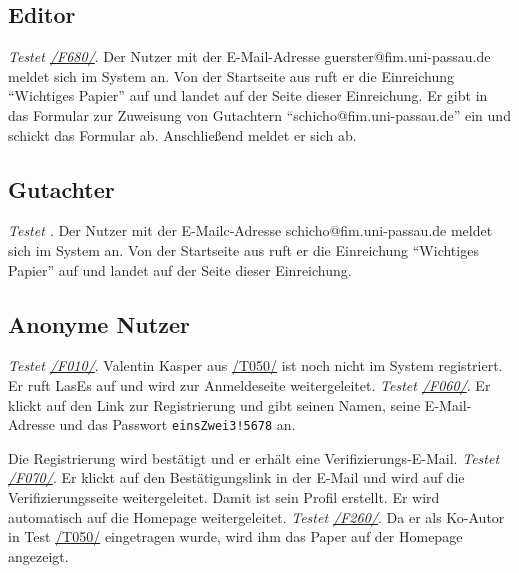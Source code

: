\subsection{Editor}
\begin{description}

	 \emph{Testet \hyperref[funkt:680]{/F680/}}.
	Der Nutzer mit der E-Mail-Adresse guerster@fim.uni-passau.de meldet sich im System an.
	Von der Startseite aus ruft er die Einreichung ``Wichtiges Papier'' auf und landet auf der Seite dieser Einreichung.
	Er gibt in das Formular zur Zuweisung von Gutachtern ``schicho@fim.uni-passau.de'' ein und schickt das Formular ab.
	Anschließend meldet er sich ab.



\end{description}

\subsection{Gutachter}
\begin{description}

	 \emph{Testet \hyperref[]{}}.
	Der Nutzer mit der E-Mailc-Adresse schicho@fim.uni-passau.de meldet sich im System an.
	Von der Startseite aus ruft er die Einreichung ``Wichtiges Papier'' auf und landet auf der Seite dieser Einreichung.

\end{description}

\subsection{Anonyme Nutzer}

\begin{description}
	 \emph{Testet \hyperref[funkt:010]{/F010/}}. Valentin Kasper aus \hyperref[t050]{/T050/} ist noch nicht im System registriert.
	Er ruft LasEs auf und wird zur Anmeldeseite weitergeleitet.
	 \emph{Testet \hyperref[funkt:060]{/F060/}}. Er klickt auf den Link zur Registrierung und gibt seinen Namen, seine E-Mail-Adresse und das Passwort \texttt{einsZwei3!5678} an.

	Die Registrierung wird bestätigt und er erhält eine Verifizierungs-E-Mail.
	 \emph{Testet \hyperref[funkt:070]{/F070/}}. Er klickt auf den Bestätigungslink in der E-Mail und wird auf die Verifizierungsseite weitergeleitet.
	Damit ist sein Profil erstellt.
	Er wird automatisch auf die Homepage weitergeleitet.
	 \emph{Testet \hyperref[funkt:260]{/F260/}}. Da er als Ko-Autor in Test \hyperref[t050]{/T050/} eingetragen wurde, wird ihm das Paper auf der Homepage angezeigt.
\end{description}

